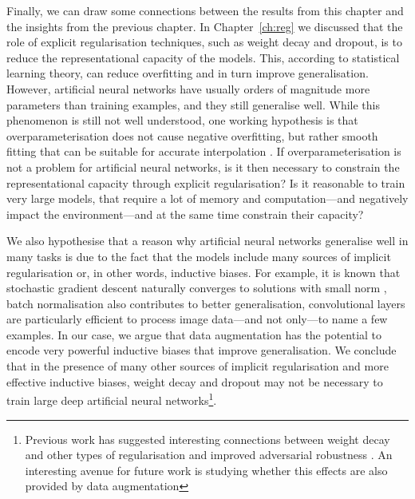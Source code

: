 {Finally, we can draw some connections between the results from this chapter and the insights from the previous chapter. In Chapter~\ref{ch:reg} we discussed that the role of explicit regularisation techniques, such as weight decay and dropout, is to reduce the representational capacity of the models. This, according to statistical learning theory, can reduce overfitting and in turn improve generalisation. However, artificial neural networks have usually orders of magnitude more parameters than training examples, and they still generalise well. While this phenomenon is still not well understood, one working hypothesis is that overparameterisation does not cause negative overfitting, but rather smooth fitting that can be suitable for accurate interpolation \citep{belkin2019biasvariance, hasson2020directfit}. If overparameterisation is not a problem for artificial neural networks, is it then necessary to constrain the representational capacity through explicit regularisation? Is it reasonable to train very large models, that require a lot of memory and computation---and negatively impact the environment---and at the same time constrain their capacity?

We also hypothesise that a reason why artificial neural networks generalise well in many tasks is due to the fact that the models include many sources of implicit regularisation or, in other words, inductive biases. For example, it is known that stochastic gradient descent naturally converges to solutions with small norm \citep{zhang2016understandingdl, neyshabur2014implicitreg}, batch normalisation also contributes to better generalisation, convolutional layers are particularly efficient to process image data---and not only---to name a few examples. In our case, we argue that data augmentation has the potential to encode very powerful inductive biases that improve generalisation. We conclude that in the presence of many other sources of implicit regularisation and more effective inductive biases, weight decay and dropout may not be necessary to train large deep artificial neural networks\footnote{Previous work has suggested interesting connections between weight decay and other types of regularisation and improved adversarial robustness \citep{galloway2018wdadversarial, jakubovitz2018regadversarial}. An interesting avenue for future work is studying whether this effects are also provided by data augmentation}.

}
